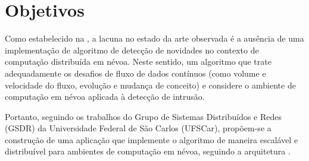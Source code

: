 
\section{Objetivos}\label{sec:objetivos}

Como estabelecido na , a lacuna no estado da arte observada é a
ausência de uma implementação de algoritmo de detecção de novidades no contexto
de computação distribuída em névoa.
Neste sentido, um algoritmo que trate adequadamente os desafios de fluxo de
dados contínuos (como volume e velocidade do fluxo, evolução e mudança de
conceito) e considere o ambiente de computação em névoa aplicada à detecção de
intrusão.

Portanto, seguindo os trabalhos do Grupo de Sistemas Distribuídos e Redes (GSDR)
da Universidade Federal de São Carlos (UFSCar), propõem-se a construção de uma
aplicação que implemente o algoritmo \minas \cite{Faria2016minas} de maneira
escalável e distribuível para ambientes de computação em névoa, seguindo a
arquitetura \arch \cite{Cassales2019}.

